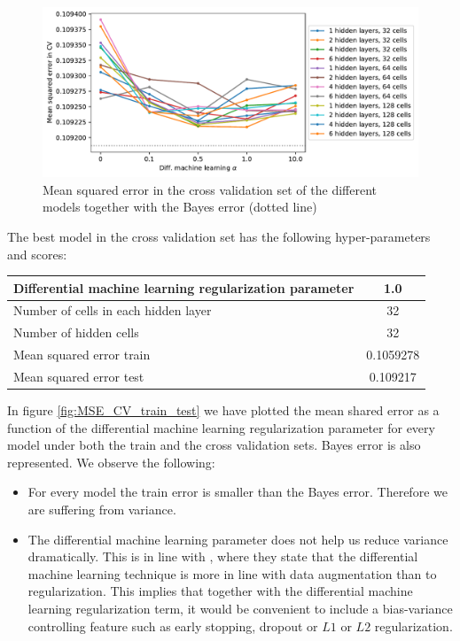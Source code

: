 \begin{figure}[H] 
\centering
\includegraphics[width=1.0\textwidth]{Figures/MarketRisk/MSE_CV.pdf}
\caption{Mean squared error in the cross validation set of the different models together with the Bayes error (dotted line)}
\label{fig:MSE_CV}
\end{figure}

The best model in the cross validation set has the following hyper-parameters and scores:

\begin{center}
\begin{tabular}{||l | c||} 
 \hline
Differential machine learning regularization parameter & 1.0 \\
 \hline
Number of cells in each hidden layer &  32 \\
  \hline
Number of hidden cells &  32 \\
  \hline
Mean squared error train &  0.1059278 \\
  \hline
Mean squared error test &  0.109217 \\
  \hline
 \end{tabular}
\end{center}

In figure \ref{fig:MSE_CV_train_test} we have plotted the mean shared error as a function of the differential machine learning regularization parameter for every model under both the train and the cross validation sets. Bayes error is also represented. We observe the following:

\begin{itemize}
    \item For every model the train error is smaller than the Bayes error. Therefore we are suffering from variance.   
    \item The differential machine learning parameter does not help us reduce variance dramatically. This is in line with \cite{HugeSavine}, where they state that the differential machine learning technique is more in line with data augmentation than to regularization. This implies that together with the differential machine learning regularization term, it would be convenient to include a bias-variance controlling feature such as early stopping, dropout or $L1$ or $L2$ regularization.
\end{itemize}


